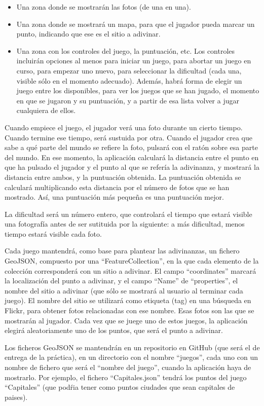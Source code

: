 \begin{itemize}
\item Una zona donde se mostrarán las fotos (de una en una).
\item Una zona donde se mostrará un mapa, para que el jugador pueda marcar un punto, indicando que ese es el sitio a adivinar.
\item Una zona con los controles del juego, la puntuación, etc. Los controles incluirán opciones al menos para iniciar un juego, para abortar un juego en curso, para empezar uno nuevo, para seleccionar la dificultad (cada una, visible sólo en el momento adecuado). Además, habrá forma de elegir un juego entre los disponibles, para ver los juegos que se han jugado, el momento en que se jugaron y su puntuación, y a partir de esa lista volver a jugar cualquiera de ellos.
\end{itemize}

Cuando empiece el juego, el jugador verá una foto durante un cierto tiempo. Cuando termine ese tiempo, será sustuida por otra. Cuando el jugador crea que sabe a qué parte del mundo se refiere la foto, pulsará con el ratón sobre esa parte del mundo. En ese momento, la aplicación calculará la distancia entre el punto en que ha pulsado el jugador y el punto al que se refería la adivinanza, y mostrará la distancia entre ambos, y la puntuación obtenida. La puntuación obtenida se calculará multiplicando esta distancia por el número de fotos que se han mostrado. Así, una puntuación más pequeña es una puntuación mejor.

La dificultad será un número entero, que controlará el tiempo que estará visible una fotografía antes de ser sutituida por la siguiente: a más dificultad, menos tiempo estará visible cada foto.

Cada juego mantendrá, como base para plantear las adivinanzas, un fichero GeoJSON, compuesto por una ``FeatureCollection'', en la que cada elemento de la colección corresponderá con un sitio a adivinar. El campo ``coordinates'' marcará la localización del punto a adivinar, y el campo ``Name'' de ``properties'', el nombre del sitio a adivinar (que sólo se mostrará al usuario al terminar cada juego). El nombre del sitio se utilizará como etiqueta (tag) en una búsqueda en Flickr, para obtener fotos relacionadas con ese nombre. Esas fotos son las que se mostrarán al jugador. Cada vez que se juege uno de estos juegos, la aplicación elegirá aleatoriamente uno de los puntos, que será el punto a adivinar.

Los ficheros GeoJSON se mantendrán en un repositorio en GitHub (que será el de entrega de la práctica), en un directorio con el nombre ``juegos'', cada uno con un nombre de fichero que será el ``nombre del juego'', cuando la aplicación haya de mostrarlo. Por ejemplo, el fichero ``Capitales.json'' tendrá los puntos del juego ``Capitales'' (que podŕia tener como puntos ciudades que sean capitales de paises).

